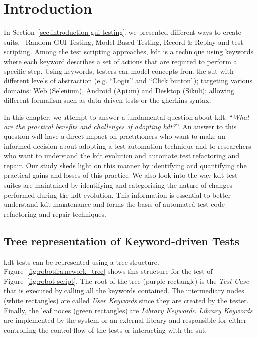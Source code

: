 \section{Introduction}
\label{sec:evolution-introduction}

In Section~\ref{sec:introduction-gui-testing}, we presented different ways to create \gls{suit}s, \ie\ Random GUI Testing, Model-Based Testing, Record \& Replay and test scripting. Among the test scripting approaches, \gls{kdt} is a technique using keywords where each keyword describes a set of actions that are required to perform a specific step. Using keywords, testers can model concepts from the \gls{sut} with different levels of abstraction (e.g. ``Login'' and
``Click button''); targeting various domains: Web (Selenium), Android (Apium) and Desktop (Sikuli); allowing different formalism such as data driven tests or the gherkins syntax.

In this chapter, we attempt to answer a fundamental question about \gls{kdt}: ``\emph{What are the practical benefits and challenges of adopting \gls{kdt}?}''.  An answer to this question will have a direct impact on practitioners who want to make an informed decision about adopting a test automation technique and to researchers who want to understand the \gls{kdt} evolution and automate test refactoring and repair. Our study sheds light on this manner by identifying and quantifying the practical gains and losses of this practice. We also look into the way \gls{kdt} test suites are maintained by identifying and categorising the nature of changes performed during the \gls{kdt} evolution. This information is essential to better understand \gls{kdt} maintenance and forms the basis of automated test code refactoring and repair techniques. 


\subsection{Tree representation of Keyword-driven Tests}
\label{sec:tree-representation-KDT}

\gls{kdt} tests can be represented using a tree structure. Figure~\ref{fig:robotframework_tree} shows this structure for the test of Figure~\ref{fig:robot-script}. The root of the tree (purple rectangle) is the \emph{Test Case} that is executed by calling all the keywords contained. The intermediary nodes (white rectangles) are called \emph{User Keywords} since they are created by the tester. Finally, the leaf nodes (green rectangles) are \emph{Library Keywords}. \emph{Library Keywords} are implemented by the system or an external library and responsible for either controlling the control flow of the tests or interacting with the \gls{sut}.

